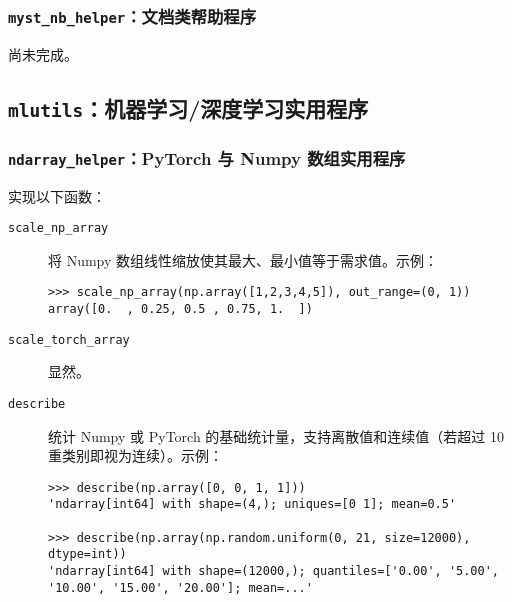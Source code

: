 \documentclass[pdf,9pt]{beamer}
\begin{document}
    \subsubsection{\texttt{myst\_nb\_helper}：文档类帮助程序}

    \begin{frame}{\subsubsecname}
        尚未完成。
    \end{frame}

    \subsection{\texttt{mlutils}：机器学习/深度学习实用程序}

    \begin{frame}
        \subsectionpage
    \end{frame}

    \subsubsection{\texttt{ndarray\_helper}：PyTorch 与 Numpy 数组实用程序}

    \begin{frame}[fragile]{\subsubsecname}
        实现以下函数：

        \begin{description}
            \item[\Verb|scale_np_array|] 将 Numpy 数组线性缩放使其最大、最小值等于需求值。示例：
            
            \begin{verbatim}
>>> scale_np_array(np.array([1,2,3,4,5]), out_range=(0, 1))
array([0.  , 0.25, 0.5 , 0.75, 1.  ])
            \end{verbatim}

            \item[\Verb|scale_torch_array|] 显然。
            \item[\Verb|describe|] 统计 Numpy 或 PyTorch 的基础统计量，支持离散值和连续值（若超过 10 重类别即视为连续）。示例：
            
            \begin{verbatim}
>>> describe(np.array([0, 0, 1, 1]))
'ndarray[int64] with shape=(4,); uniques=[0 1]; mean=0.5'

>>> describe(np.array(np.random.uniform(0, 21, size=12000), dtype=int))
'ndarray[int64] with shape=(12000,); quantiles=['0.00', '5.00', '10.00', '15.00', '20.00']; mean=...'
            \end{verbatim}
        \end{description}
    \end{frame}
\end{document}
